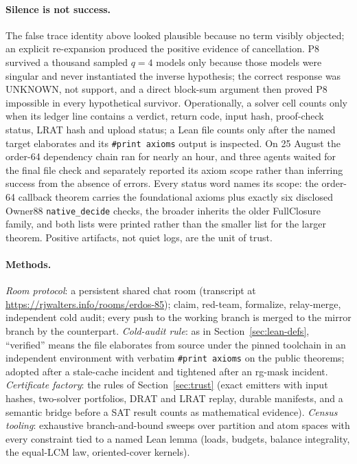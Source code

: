 \documentclass{anvil-paper}
\theoremstyle{definition}
\begin{document}
\paragraph{Silence is not success.} The false trace identity above looked plausible because no term visibly objected; an explicit re-expansion produced the positive evidence of cancellation. P8 survived a thousand sampled $q=4$ models only because those models were singular and never instantiated the inverse hypothesis; the correct response was UNKNOWN, not support, and a direct block-sum argument then proved P8 impossible in every hypothetical survivor. Operationally, a solver cell counts only when its ledger line contains a verdict, return code, input hash, proof-check status, LRAT hash and upload status; a Lean file counts only after the named target elaborates and its \texttt{\#print axioms} output is inspected. On 25 August the order-64 dependency chain ran for nearly an hour, and three agents waited for the final file check and separately reported its axiom scope rather than inferring success from the absence of errors. Every status word names its scope: the order-64 callback theorem  carries the foundational axioms plus exactly six disclosed Owner88 \texttt{native\_decide} checks, the broader  inherits the older FullClosure family, and both lists were printed rather than the smaller list for the larger theorem. Positive artifacts, not quiet logs, are the unit of trust.

\paragraph{Methods.} \emph{Room protocol}: a persistent shared chat room (transcript at \url{https://rjwalters.info/rooms/erdos-85}); claim, red-team, formalize, relay-merge, independent cold audit; every push to the working branch is merged to the mirror branch by the counterpart. \emph{Cold-audit rule}: as in Section~\ref{sec:lean-defs}, ``verified'' means the file elaborates from source under the pinned toolchain in an independent environment with verbatim \texttt{\#print axioms} on the public theorems; adopted after a stale-cache incident and tightened after an rg-mask incident. \emph{Certificate factory}: the rules of Section~\ref{sec:trust} (exact emitters with input hashes, two-solver portfolios, DRAT and LRAT replay, durable manifests, and a semantic bridge before a SAT result counts as mathematical evidence). \emph{Census tooling}: exhaustive branch-and-bound sweeps over partition and atom spaces with every constraint tied to a named Lean lemma (loads, budgets, balance integrality, the equal-LCM law, oriented-cover kernels).



\end{document}

